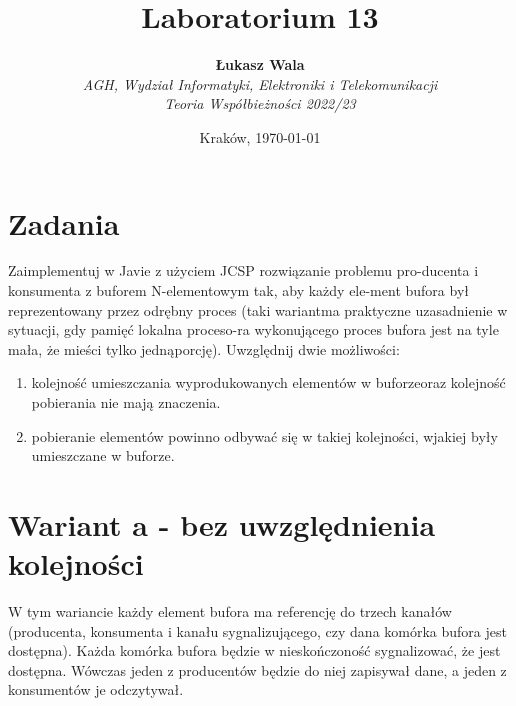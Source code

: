 \documentclass{article}
\title{Laboratorium 13}
\author{\textbf{Łukasz Wala}\\
    \textit{AGH, Wydział Informatyki, Elektroniki i Telekomunikacji} \\
    \textit{Teoria Współbieżności 2022/23}}
\date{Kraków, \today}
\begin{document}
\maketitle

\section{Zadania}

Zaimplementuj w Javie z użyciem JCSP rozwiązanie problemu pro-ducenta i konsumenta z buforem N-elementowym tak, 
aby każdy ele-ment bufora był reprezentowany przez odrębny proces (taki wariantma praktyczne uzasadnienie w sytuacji, 
gdy pamięć lokalna proceso-ra wykonującego proces bufora jest na tyle mała, że mieści tylko jednąporcję). Uwzględnij dwie możliwości:

\begin{enumerate}[label=\alph*)]
    \item
    kolejność umieszczania wyprodukowanych elementów w buforzeoraz kolejność pobierania nie mają znaczenia.
    \item
    pobieranie elementów powinno odbywać się w takiej kolejności, wjakiej były umieszczane w buforze.
\end{enumerate}

\section{Wariant a - bez uwzględnienia kolejności}

W tym wariancie każdy element bufora ma referencję do trzech kanałów (producenta, konsumenta i kanału
sygnalizującego, czy dana komórka bufora jest dostępna). Każda komórka bufora będzie w nieskończoność
sygnalizować, że jest dostępna. Wówczas jeden z producentów będzie do niej zapisywał dane, a jeden z konsumentów
je odczytywał.
\end{document}
